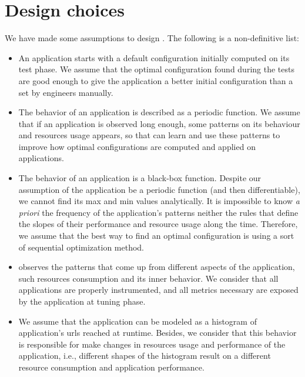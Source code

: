 \section{Design choices} \label{sec:design.choices}


We have made some assumptions to design \name. The following is a non-definitive
list:

\begin{itemize}

\item An application starts with a default configuration initially computed on
  its test phase. We assume that the optimal configuration found during the
    tests are good enough to give the application a better initial configuration
    than a set by engineers manually.

\item The behavior of an application is described as a periodic function. We
  assume that if an application is observed long enough, some patterns on its
    behaviour and resources usage appears, so that \name can learn and use these
    patterns to improve how optimal configurations are computed and applied on
    applications.

\item The behavior of an application is a black-box function. Despite our
  assumption of the application be a periodic function (and then
    differentiable), we cannot find its max and min values analytically. It is
    impossible to know \textit{a priori} the frequency of the application's
    patterns neither the rules that define the slopes of their performance and
    resource usage along the time. Therefore, we assume that the best way to
    find an optimal configuration is using a sort of sequential optimization
    method.

\item \name observes the patterns that come up from different aspects of the
  application, such resources consumption and its inner behavior. We consider
    that all applications are properly instrumented, and all metrics necessary
    are exposed by the application at tuning phase.

\item We assume that the application can be modeled as a histogram of
  application's urls reached at runtime. Besides, we consider that this behavior
    is responsible for make changes in resources usage and performance of the
    application, i.e., different shapes of the histogram result on a different
    resource consumption and application performance.  


\end{itemize}
